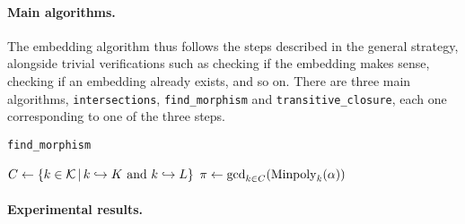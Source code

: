 \paragraph{Main algorithms.} The embedding algorithm thus follows the steps
described in the general strategy, alongside trivial verifications such as
checking if the embedding makes sense, checking if an embedding already exists,
and so on. There are three main algorithms, \texttt{intersections},
\texttt{find\_morphism} and \texttt{transitive\_closure}, each one corresponding
to one of the three steps.

\begin{algorithm}
  \caption{\texttt{find\_morphism}}
  \label{algo:find-morphism}
  \begin{algorithmic}[1]
    \State $C\gets\left\{k\in\mathcal K\,|\,k\hookrightarrow K\text{ and }k\hookrightarrow L \right\}$
    \State $\pi\gets\gcd_{k\in C}(\operatorname{Minpoly}_k(\alpha))$
  \end{algorithmic}
\end{algorithm}

\paragraph{Experimental results.}
%
